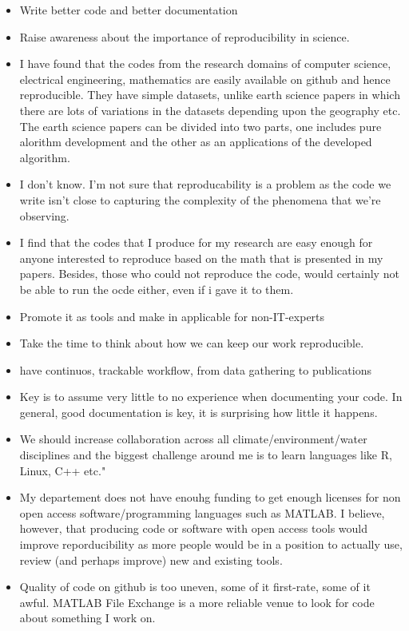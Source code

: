 \documentclass{article}
\begin{document}
\begin{itemize}
	\item Write better code and better documentation
	\item Raise awareness about the importance of reproducibility in science.
	\item I have found that the codes from the research domains of computer science, electrical engineering, mathematics are easily available on github and hence reproducible. They have simple datasets, unlike earth science papers in which there are lots of variations in the datasets depending upon the geography etc. The earth science papers can be divided into two parts, one includes pure alorithm development and the other as an applications of the developed algorithm.
	\item I don't know. I'm not sure that reproducability is a problem as the code we write isn't close to capturing the complexity of the phenomena that we're observing.
	\item I find that the codes that I produce for my research are easy enough for anyone interested to reproduce based on the math that is presented in my papers. Besides, those who could not reproduce the code, would certainly not be able to run the ocde either, even if i gave it to them.
	\item Promote it as tools and make in applicable for non-IT-experts
	\item Take the time to think about how we can keep our work reproducible.
	\item have continuos, trackable workflow, from data gathering to publications
	\item Key is to assume very little to no experience when documenting your code. In general, good documentation is key, it is surprising how little it happens.
	\item We should increase collaboration across all climate/environment/water disciplines and the biggest challenge around me is to learn languages like R, Linux, C++ etc."
	\item My departement does not have enouhg funding to get enough licenses for non open access software/programming languages such as MATLAB. I believe, however, that producing code or software with open access tools would improve reporducibility as more people would be in a position to actually use, review (and perhaps improve) new and existing tools.
	\item Quality of code on github is too uneven, some of it first-rate, some of it awful. MATLAB File Exchange is a more reliable venue to look for code about something I work on.

\end{itemize}
\end{document}
